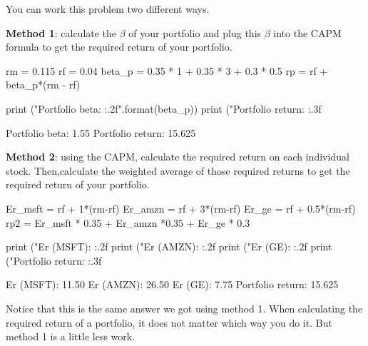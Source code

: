 \cprotEnv \begin{solution}
You can work this problem two different ways.

\textbf{Method 1}: calculate the \(\beta\) of your portfolio and plug this \(\beta\) into the CAPM formula to get the required return of your portfolio.

\begin{ipython}
rm = 0.115
rf = 0.04
beta_p = 0.35 * 1 + 0.35 * 3 + 0.3 * 0.5
rp = rf + beta_p*(rm - rf)

print ("Portfolio beta: {:.2f}".format(beta_p))
print ("Portfolio return: {:.3f}%
\end{ipython}
\begin{ioutput}
Portfolio beta: 1.55
Portfolio return: 15.625%
\end{ioutput}

\textbf{Method 2}: using the CAPM, calculate the required return on each individual stock. Then,calculate the weighted average of those required returns to get the required return of your portfolio.

\begin{ipython}
Er_msft = rf + 1*(rm-rf)
Er_amzn = rf + 3*(rm-rf)
Er_ge = rf + 0.5*(rm-rf)
rp2 = Er_msft * 0.35 + Er_amzn *0.35 + Er_ge * 0.3

print ("Er (MSFT): {:.2f}%
print ("Er (AMZN): {:.2f}%
print ("Er (GE): {:.2f}%
print ("Portfolio return: {:.3f}%
\end{ipython}
\begin{ioutput}
Er (MSFT): 11.50%
Er (AMZN): 26.50%
Er (GE): 7.75%
Portfolio return: 15.625%
\end{ioutput}
Notice that this is the same answer we got using method 1. When calculating the required return of a portfolio, it does not matter which way you do it. But method 1 is a little less work.
\end{solution}

